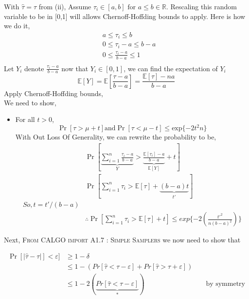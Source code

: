 \documentclass[a4paper, 11pt]{article}
\begin{document}
\begin{itemize}
With $\mathbb{\hat{\tau}} = \tau$ from (ii), Assume $\tau_i \in [a,b] \text{ for } a \leq b \in \mathbb{R}$. Rescaling this random variable to be in [0,1] will allows Chernoff-Hoffding bounds to apply. 
Here is how we do it,
\begin{align*}
&a \leq \tau_i \leq b\\
& 0 \leq \tau_i -a \leq b-a \\
& 0\leq \frac{\tau_i -a}{b-a} \leq 1\\
\end{align*}
Let $Y_i$ denote $\frac{\tau_i -a}{b-a} $ now that $Y_i \in [0,1]$, we can find the expectation of $Y_i$
$$\mathbb{E}[Y] = \mathbb{E} [\frac{\tau -a}{b-a}] = \frac{\mathbb{E}[\tau] -na}{b-a} $$
Apply Chernoff-Hoffding bounds,\\
We need to show,
\begin{itemize}
\item For all $ t > 0$,\\
$$\Pr[\tau>\mu +t] \text{and} \Pr[\tau<\mu -t] \leq \text{exp}\{-2t^2n\}$$
\quad 
With Out Loss Of Generality, we can rewrite the probability to be,
\begin{align*}
&\Pr[\underbrace{\sum_{i=1}^n\frac{\tau_i -a}{b-a} }_{Y} > \underbrace{\frac{\mathbb{E}[\tau_i] -a}{b-a}}_{\mathbb{E} [Y]} + t ] \\
&\Pr[\sum_{i=1}^n \tau_i > \mathbb{E}[\tau] + \underbrace{(b-a)t}_{t'} ]\\
So, t = t'/(b-a)\\
&\therefore \Pr[\sum_{i=1}^n \tau_i > \mathbb{E}[\tau] + t] \leq exp\{-2(\frac{t'^2}{n(b-a)^2})\} 
\end{align*}
\end{itemize}
 
Next,  \textsc{From CALGO import A1.7 : Simple Samplers}
we now need to show that 

\begin{align*}
\Pr[|\hat{\tau} -\tau|] < \varepsilon]& \geq 1 - \delta \\
&\leq 1 - (Pr[ \hat{\tau} < \tau-\varepsilon ] +Pr[ \hat{\tau} > \tau+\varepsilon ])\\
&\leq 1 - 2(\underbrace{Pr[ \hat{\tau} < \tau-\varepsilon ]}_{*}) &&\text{ by symmetry}\\
\end{align*}


\end{itemize}
\end{document}
